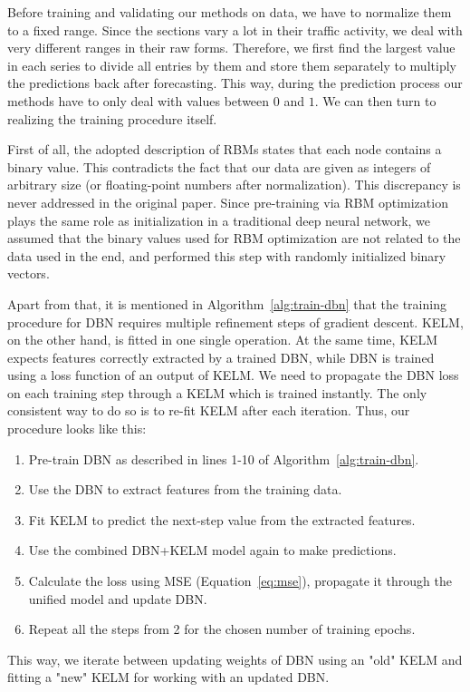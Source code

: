 Before training and validating our methods on data, we have to normalize them to
a fixed range. Since the sections vary a lot in their traffic activity, we deal
with very different ranges in their raw forms. Therefore, we first find the
largest value in each series to divide all entries by them and store them
separately to multiply the predictions back after forecasting. This way, during
the prediction process our methods have to only deal with values between $0$ and
$1$. We can then turn to realizing the training procedure itself.

First of all, the adopted description of RBMs states that each node contains a
binary value. This contradicts the fact that our data are given as integers of
arbitrary size (or floating-point numbers after normalization). This discrepancy
is never addressed in the original paper. Since pre-training via RBM
optimization plays the same role as initialization in a traditional deep neural
network, we assumed that the binary values used for RBM optimization are not
related to the data used in the end, and performed this step with randomly
initialized binary vectors.

Apart from that, it is mentioned in Algorithm~\ref{alg:train-dbn} that the
training procedure for DBN requires multiple refinement steps of gradient
descent. KELM, on the other hand, is fitted in one single operation. At the same
time, KELM expects features correctly extracted by a trained DBN, while DBN is
trained using a loss function of an output of KELM. We need to propagate the DBN
loss on each training step through a KELM which is trained instantly. The only
consistent way to do so is to re-fit KELM after each iteration. Thus, our 
procedure looks like this:
\begin{enumerate}
	\item Pre-train DBN as described in lines 1-10 of Algorithm~\ref{alg:train-dbn}.
	\item Use the DBN to extract features from the training data.
	\item Fit KELM to predict the next-step value from the extracted features.
	\item Use the combined DBN+KELM model again to make predictions.
	\item Calculate the loss using MSE (Equation~\ref{eq:mse}), propagate it
	through the unified model and update DBN.
	\item Repeat all the steps from 2 for the chosen number of training epochs.
\end{enumerate}
This way, we iterate between updating weights of DBN using an "old" KELM and
fitting a "new" KELM for working with an updated DBN.

